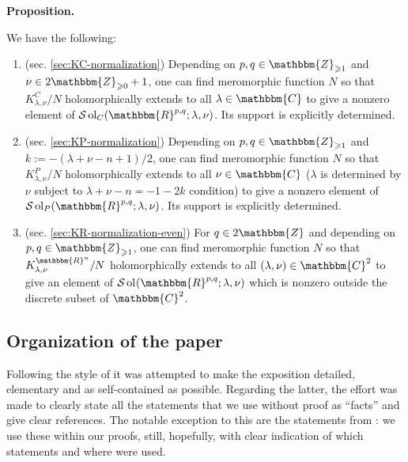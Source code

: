\documentclass{article}
\newcommand{\assign}{:=}
\newcommand{\tmop}[1]{\ensuremath{\operatorname{#1}}}
\newcommand{\tmtextbf}[1]{{\bfseries{#1}}}
\newcommand{\tmtextit}[1]{{\itshape{#1}}}
\numberwithin{definition}{section}
\numberwithin{lemma}{section}
\numberwithin{proposition}{section}
{\theorembodyfont{\rmfamily}\newtheorem{remark}{Remark}
\numberwithin{remark}{section}
}
\begin{document}
{\noindent}\tmtextbf{Proposition. }\tmtextit{We have the following:
\begin{enumerate}
  \item (sec. \ref{sec:KC-normalization}) Depending on $p, q \in
  \mathbbm{Z}_{\geqslant 1}$ and $\nu \in 2\mathbbm{Z}_{\geqslant 0} + 1$, one
  can find meromorphic function $N$ so that $K_{\lambda, \nu}^C / N$
  holomorphically extends to all $\lambda \in \mathbbm{C}$ to give a nonzero
  element of $\mathcal{S} \tmop{ol}_C ( \mathbbm{R}^{p, q} ; \lambda, \nu)$.
  Its support is explicitly determined.
  
  \item (sec. \ref{sec:KP-normalization}) Depending on $p, q \in
  \mathbbm{Z}_{\geqslant 1}$ and $k \assign - ( \lambda + \nu - n + 1) / 2$,
  one can find meromorphic function $N$ so that $K_{\lambda, \nu}^P / N$
  holomorphically extends to all $\nu \in \mathbbm{C}$ ($\lambda$ is
  determined by $\nu$ subject to $\lambda + \nu - n = - 1 - 2 k$ condition) to
  give a nonzero element of $\mathcal{S} \tmop{ol}_P ( \mathbbm{R}^{p, q} ;
  \lambda, \nu)$. Its support is explicitly determined.
  
  \item (sec. \ref{sec:KR-normalization-even}) For $q \in 2\mathbbm{Z}$ and
  depending on $p, q \in \mathbbm{Z}_{\geqslant 1}$, one can find meromorphic
  function $N$ so that $K_{\lambda, \nu}^{\mathbbm{R}^n} / N$ holomorphically
  extends to all $ ( \lambda, \nu) \in \mathbbm{C}^2$ to give an element of
  $\mathcal{S} \tmop{ol}_{} ( \mathbbm{R}^{p, q} ; \lambda, \nu)$ which is
  nonzero outside the discrete subset of $\mathbbm{C}^2$.
\end{enumerate}}{\hspace*{\fill}}{\medskip}

\subsection{Organization of the paper}

Following the style of {\cite{kobayashi2015symmetry}} it was attempted to make
the exposition detailed, elementary and as self-contained as possible.
Regarding the latter, the effort was made to clearly state all the statements
that we use without proof as ``facts'' and give clear references. The notable
exception to this are the statements from {\cite{kobayashi2015symmetry}}: we
use these within our proofs, still, hopefully, with clear indication of which
statements and where were used.
\end{document}
